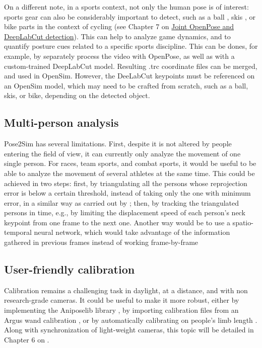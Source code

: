 On a different note, in a sports context, not only the human pose is of interest: sports gear can also be considerably important to detect, such as a ball \cite{Ghasemzadeh2021}, skis \cite{Ludwig2020}, or bike parts in the context of cycling (see Chapter 7 on \hyperref[ch:7]{Joint OpenPose and DeepLabCut detection}). This can help to analyze game dynamics, and to quantify posture cues related to a specific sports discipline. This can be dones, for example, by separately process the video with OpenPose, as well as with a custom-trained DeepLabCut model. Resulting .trc coordinate files can be merged, and used in OpenSim. However, the DeeLabCut keypoints must be referenced on an OpenSim model, which may need to be crafted from scratch, such as a ball, skis, or bike, depending on the detected object.


\subsection{Multi-person analysis}

Pose2Sim has several limitations. First, despite it is not altered by people entering the field of view, it can currently only analyze the movement of one single person. For races, team sports, and combat sports, it would be useful to be able to analyze the movement of several athletes at the same time. This could be achieved in two steps: first, by triangulating all the persons whose reprojection error is below a certain threshold, instead of taking only the one with minimum error, in a similar way as carried out by \cite{Slembrouck2020}; then, by tracking the triangulated persons in time, e.g., by limiting the displacement speed of each person’s neck keypoint from one frame to the next one. Another way would be to use a spatio-temporal neural network, which would take advantage of the information gathered in previous frames instead of working frame-by-frame \cite{Raaj2019}


\subsection{User-friendly calibration}

Calibration remains a challenging task in daylight, at a distance, and with non research-grade cameras. It could be useful to make it more robust, either by implementing the Aniposelib library \cite{Karashchuk2020}, by importing calibration files from an Argus wand calibration \cite{Argus2020}, or by automatically calibrating on people’s limb length \cite{Liu2022a}. Along with synchronization of light-weight cameras, this topic will be detailed in Chapter 6 on .

